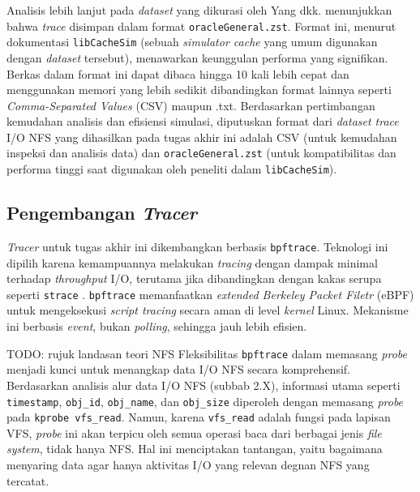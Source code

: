 Analisis lebih lanjut pada \textit{dataset} yang dikurasi oleh Yang dkk. menunjukkan bahwa \textit{trace} disimpan dalam format \texttt{oracleGeneral.zst}. Format ini, menurut dokumentasi \texttt{libCacheSim} (sebuah \textit{simulator cache} yang umum digunakan dengan \textit{dataset} tersebut), menawarkan keunggulan performa yang signifikan. Berkas dalam format ini dapat dibaca hingga 10 kali lebih cepat dan menggunakan memori yang lebih sedikit dibandingkan format lainnya seperti \textit{Comma-Separated Values} (CSV) maupun .txt. Berdasarkan pertimbangan kemudahan analisis dan efisiensi simulasi, diputuskan format dari \textit{dataset trace} I/O NFS yang dihasilkan pada tugas akhir ini adalah CSV (untuk kemudahan inspeksi dan analisis data) dan \texttt{oracleGeneral.zst} (untuk kompatibilitas dan performa tinggi saat digunakan oleh peneliti dalam \texttt{libCacheSim}).

\subsection{Pengembangan \textit{Tracer}}
\label{sec:pengembangan_tracer}

\textit{Tracer} untuk tugas akhir ini dikembangkan berbasis \texttt{bpftrace}. Teknologi ini dipilih karena kemampuannya melakukan \textit{tracing} dengan dampak minimal terhadap \textit{throughput} I/O, terutama jika dibandingkan dengan kakas serupa seperti \texttt{strace} \parencite{TracerFile}. \texttt{bpftrace} memanfaatkan \textit{extended Berkeley Packet Filetr} (eBPF) untuk mengeksekusi \textit{script tracing} secara aman di level \textit{kernel} Linux. Mekanisme ini berbasis \textit{event}, bukan \textit{polling}, sehingga jauh lebih efisien.

TODO: rujuk landasan teori NFS
Fleksibilitas \texttt{bpftrace} dalam memasang \textit{probe} menjadi kunci untuk menangkap data I/O NFS secara komprehensif. Berdasarkan analisis alur data I/O NFS (subbab 2.X), informasi utama seperti \texttt{timestamp}, \texttt{obj\_id}, \texttt{obj\_name}, dan \texttt{obj\_size} diperoleh dengan memasang \textit{probe} pada \texttt{kprobe vfs\_read}. Namun, karena \texttt{vfs\_read} adalah fungsi pada lapisan VFS, \textit{probe} ini akan terpicu oleh semua operasi baca dari berbagai jenis \textit{file system}, tidak hanya NFS. Hal ini menciptakan tantangan, yaitu bagaimana menyaring data agar hanya aktivitas I/O yang relevan degnan NFS yang tercatat.

